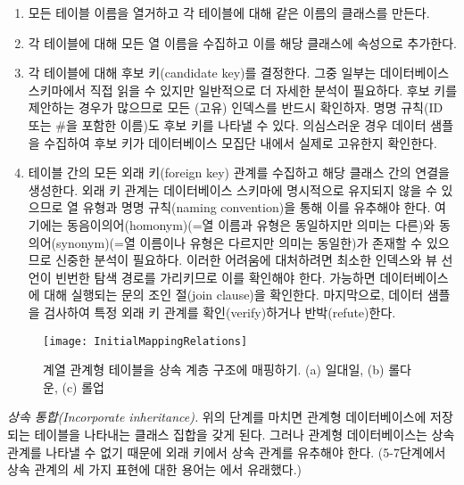 \documentclass[a4paper,10pt,twoside]{book}
\begin{document}
\begin{enumerate}
  \item 모든 테이블 이름을 열거하고 각 테이블에 대해 같은 이름의 클래스를 만든다.

  \item 각 테이블에 대해 모든 열 이름을 수집하고 이를 해당 클래스에 속성으로 추가한다.

  \item 각 테이블에 대해 후보 키(candidate key)를 결정한다. 그중 일부는 데이터베이스 스키마에서 직접 읽을 수 있지만 일반적으로 더 자세한 분석이 필요하다. 후보 키를 제안하는 경우가 많으므로 모든 (고유) 인덱스를 반드시 확인하자. 명명 규칙(ID 또는 \#을 포함한 이름)도 후보 키를 나타낼 수 있다. 의심스러운 경우 데이터 샘플을 수집하여 후보 키가 데이터베이스 모집단 내에서 실제로 고유한지 확인한다.

  \item 테이블 간의 모든 외래 키(foreign key) 관계를 수집하고 해당 클래스 간의 연결을 생성한다. 외래 키 관계는 데이터베이스 스키마에 명시적으로 유지되지 않을 수 있으므로 열 유형과 명명 규칙(naming convention)을 통해 이를 유추해야 한다. 여기에는 동음이의어(homonym)(=열 이름과 유형은 동일하지만 의미는 다른)와 동의어(synonym)(=열 이름이나 유형은 다르지만 의미는 동일한)가 존재할 수 있으므로 신중한 분석이 필요하다. 이러한 어려움에 대처하려면 최소한 인덱스와 뷰 선언이 빈번한 탐색 경로를 가리키므로 이를 확인해야 한다. 가능하면 데이터베이스에 대해 실행되는  문의 조인 절(join clause)을 확인한다. 마지막으로, 데이터 샘플을 검사하여 특정 외래 키 관계를 확인(verify)하거나 반박(refute)한다.

\end{enumerate}

\begin{figure}
\begin{center}
\texttt{[image: InitialMappingRelations]}
\caption{계열 관계형 테이블을 상속 계층 구조에 매핑하기. (a) 일대일, (b) 롤다운, (c) 롤업}
\end{center}
\end{figure}

\noindent
\emph{상속 통합(Incorporate inheritance).}
위의 단계를 마치면 관계형 데이터베이스에 저장되는 테이블을 나타내는 클래스 집합을 갖게 된다. 그러나 관계형 데이터베이스는 상속 관계를 나타낼 수 없기 때문에 외래 키에서 상속 관계를 유추해야 한다. (5-7단계에서 상속 관계의 세 가지 표현에 대한 용어는 \cite{Fros94a}에서 유래했다.)
\end{document}
